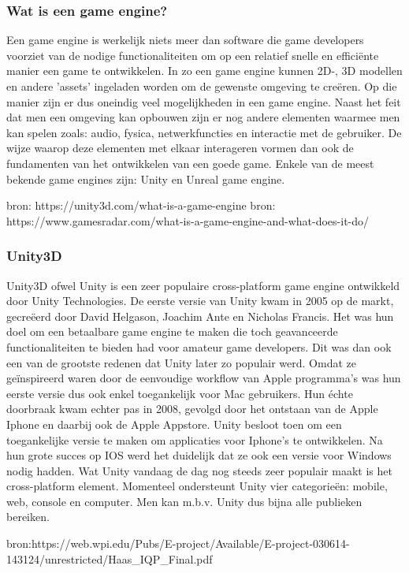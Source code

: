 \subsubsection{Wat is een game engine?}
Een game engine is werkelijk niets meer dan software die game developers voorziet van de nodige functionaliteiten om op een relatief snelle en efficiënte manier een game te ontwikkelen. In zo een game engine kunnen 2D-, 3D modellen en andere 'assets' ingeladen worden om de gewenste omgeving te creëren. Op die manier zijn er dus oneindig veel mogelijkheden in een game engine. Naast het feit dat men een omgeving kan opbouwen zijn er nog andere elementen waarmee men kan spelen zoals: audio, fysica, netwerkfuncties en interactie met de gebruiker. De wijze  waarop deze elementen met elkaar interageren vormen dan ook de fundamenten van het ontwikkelen van een goede game. Enkele van de meest bekende game engines zijn: Unity en Unreal game engine.
 

bron: https://unity3d.com/what-is-a-game-engine
bron: https://www.gamesradar.com/what-is-a-game-engine-and-what-does-it-do/

\subsubsection{Unity3D}

Unity3D ofwel Unity is een zeer populaire cross-platform game engine ontwikkeld door Unity Technologies.
De eerste versie van Unity kwam in 2005 op de markt, gecreëerd door David Helgason, Joachim Ante en Nicholas Francis. Het was hun doel om een betaalbare game engine te maken die toch geavanceerde functionaliteiten te bieden had voor amateur game developers. Dit was dan ook een van de grootste redenen dat Unity later zo populair werd. Omdat ze geïnspireerd waren door de eenvoudige workflow van Apple programma's was hun eerste versie dus ook enkel toegankelijk voor Mac gebruikers. Hun échte doorbraak kwam echter pas in 2008, gevolgd door het ontstaan van de Apple Iphone en daarbij ook de Apple Appstore. Unity besloot toen om een toegankelijke versie te maken om applicaties voor Iphone's te ontwikkelen. Na hun grote succes op IOS werd het duidelijk dat ze ook een versie voor Windows nodig hadden. Wat Unity vandaag de dag nog steeds zeer populair maakt is het cross-platform element. Momenteel ondersteunt Unity vier categorieën: mobile, web, console en computer. Men kan m.b.v. Unity dus bijna alle publieken bereiken.

bron:https://web.wpi.edu/Pubs/E-project/Available/E-project-030614-143124/unrestricted/Haas\_IQP\_Final.pdf

